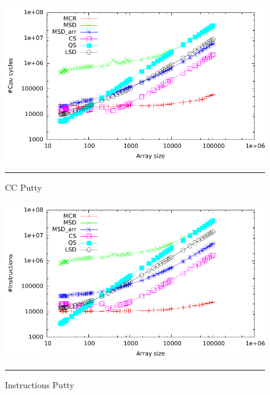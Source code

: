 \begin{figure}[htbp]
	\centering
		\includegraphics[width=\textwidth]{./Appendices/Figures/Project2b/Cpu_cycles.pdf}
		\rule{35em}{0.5pt}
	\caption[Cpu cycles]{
	CC Putty
	}
	\label{fig:Cpu_cycles_p2b_putty}
\end{figure}
\begin{figure}[htbp]
	\centering
		\includegraphics[width=\textwidth]{./Appendices/Figures/Project2b/Instructions.pdf}
		\rule{35em}{0.5pt}
	\caption[Instructions putty]{
	Instructions Putty
	}
	\label{fig:Instructions_p2b_putty}
\end{figure}